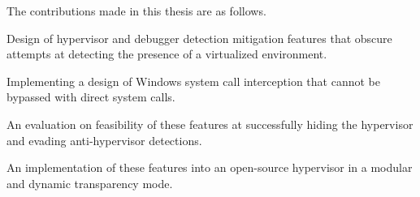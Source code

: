 The contributions made in this thesis are as follows.

\case{}
Design of hypervisor and debugger detection mitigation features that obscure attempts at detecting the presence of a virtualized environment.

\case{}
Implementing a design of Windows system call interception that cannot be bypassed with direct system calls. 

\case{}
An evaluation on feasibility of these features at successfully hiding the hypervisor and evading anti-hypervisor detections.

\case{}
An implementation of these features into an open-source hypervisor in a modular and dynamic transparency mode.


